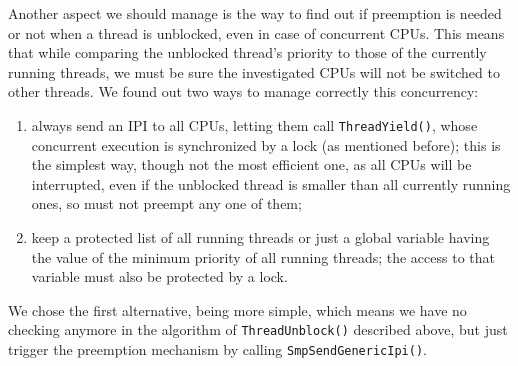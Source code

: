 Another aspect we should manage is the way to find out if preemption is needed or not when a thread is unblocked, even in case of concurrent CPUs. This means that while comparing the unblocked thread's priority to those of the currently running threads, we must be sure the investigated CPUs will not be switched to other threads. We found out two ways to manage correctly this concurrency:
\begin{enumerate}
    \item always send an IPI to all CPUs, letting them call \lstinline|ThreadYield()|, whose concurrent execution is synchronized by a lock (as mentioned before); this is the simplest way, though not the most efficient one, as all CPUs will be interrupted, even if the unblocked thread is smaller than all currently running ones, so must not preempt any one of them;
    
    \item keep a protected list of all running threads or just a global variable having the value of the minimum priority of all running threads; the access to that variable must also be protected by a lock.
\end{enumerate}

We chose the first alternative, being more simple, which means we have no checking anymore in the algorithm of \lstinline|ThreadUnblock()| described above, but just trigger the preemption mechanism by calling \lstinline|SmpSendGenericIpi()|.

